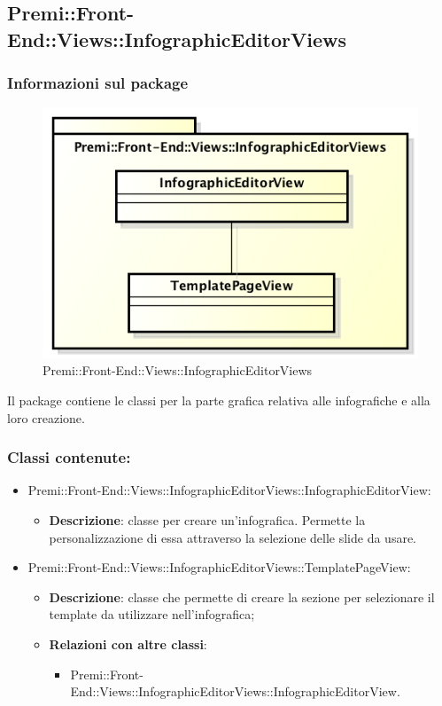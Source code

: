 \subsection{Premi::Front-End::Views::InfographicEditorViews}
	\subsubsection*{Informazioni sul package}
	\begin{figure}[h]
		\centering
		\includegraphics[width=0.7\linewidth]{img/front-end_views_infographiceditorviews}
		\caption[Premi::Front-End::Views::InfographicEditorViews]{Premi::Front-End::Views::InfographicEditorViews}
	\end{figure}
	Il package contiene le classi per la parte grafica relativa alle infografiche e alla loro creazione.

	\subsubsection*{Classi contenute:}
	\begin{itemize}
		
		\item Premi::Front-End::Views::InfographicEditorViews::InfographicEditorView:
		\begin{itemize}
			\item \textbf{Descrizione}: classe per creare un'infografica. Permette la personalizzazione di essa attraverso la selezione delle slide da usare.
		\end{itemize}
		
		\item Premi::Front-End::Views::InfographicEditorViews::TemplatePageView:
		\begin{itemize}
			\item \textbf{Descrizione}: classe che permette di creare la sezione per selezionare il template da utilizzare nell'infografica;
			\item \textbf{Relazioni con altre classi}:
			\begin{itemize}
				\item Premi::Front-End::Views::InfographicEditorViews::InfographicEditorView.
			\end{itemize}
		\end{itemize}
	\end{itemize}
